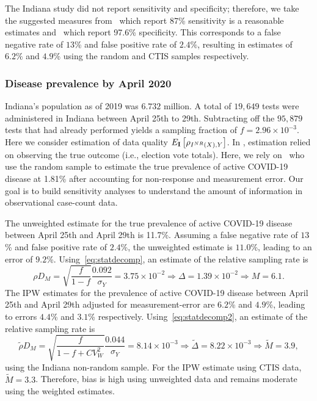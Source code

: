 \documentclass[11pt]{amsart}
\numberwithin{equation}{section}
\theoremstyle{plain}
\def\I{\bf I}
\begin{document}
 The Indiana study did not report sensitivity and specificity; therefore, we take the suggested measures from~\cite{Arevalo2020} which report 87\% sensitivity is a reasonable estimates and~\cite{Cohen2020} which report 97.6\% specificity.  This corresponds to a false negative rate of $13$\% and false positive rate of $2.4\%$, resulting in estimates of $6.2\%$ and $4.9\%$ using the random and CTIS samples respectively.

 \subsubsection{Disease prevalence by April 2020}

 Indiana's population as of 2019 was $6.732$ million.  A total of $19,649$ tests were administered in Indiana between April 25th to 29th. Subtracting off the $95,879$ tests that had already performed yields a sampling fraction of $f = 2.96 \times 10^{-3}$. Here we consider estimation of data quality $E_{\I} \left[ \rho_{I^{NR} (X),Y} \right]$. In \cite{Meng2018}, estimation relied on observing the true outcome (i.e., election vote totals). Here, we rely on~\cite{Yiannoutsos2021} who use the random sample to estimate the true prevalence of active COVID-19 disease at 1.81\% after accounting for non-response and measurement error.  Our goal is to build sensitivity analyses to understand the amount of information in observational case-count data.

 The unweighted estimate for the true prevalence of active COVID-19 disease between April 25th and April 29th is 11.7\%.  Assuming a false negative rate of $13$\% and false positive rate of $2.4$\%, the unweighted estimate is $11.0$\%, leading to an error of $9.2$\%.  Using~\eqref{eq:statdecomp}, an estimate of the relative sampling rate is
 \begin{equation*}
 \rho D_M = \sqrt{\frac{f}{1-f}} \frac{\text{0.092}}{\sigma_Y} = 3.75 \times 10^{-2} \Rightarrow \Delta = 1.39 \times 10^{-2} \Rightarrow M = 6.1.
 \end{equation*}
 The IPW estimates for the prevalence of active COVID-19 disease between April 25th and April 29th adjusted for measurement-error are $6.2$\% and $4.9$\%, leading to errors $4.4$\% and $3.1$\% respectively.  Using~\eqref{eq:statdecomp2}, an estimate of the relative sampling rate is
 \begin{equation*}
 \tilde \rho D_M = \sqrt{\frac{f}{1-f+CV_W^2}} \frac{\text{0.044}}{\sigma_Y} = 8.14 \times 10^{-3} \Rightarrow \tilde \Delta = 8.22 \times 10^{-3}  \Rightarrow \tilde M = 3.9,
 \end{equation*}
 using the Indiana non-random sample.  For the IPW estimate using CTIS data, $\tilde M = 3.3$. Therefore, bias is high using unweighted data and remains moderate using the weighted estimates.
\end{document}
